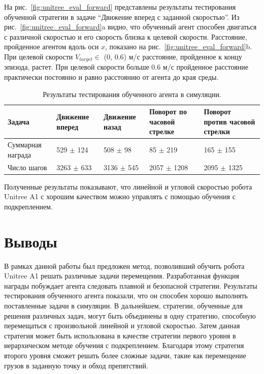 На рис.~\ref{fig:unitree_eval_forward} представлены результаты тестирования обученной стратегии в задаче ``Движение вперед с заданной скоростью''. Из рис.~\ref{fig:unitree_eval_forward}a видно, что обученный агент способен двигаться с различной скоростью и его скорость близка к целевой скорости. Расстояние, пройденное агентом вдоль оси $x$, показано на рис.~\ref{fig:unitree_eval_forward}b. При целевой скорости $V_{target} \in$ (0, 0.6) м/с расстояние, пройденное к концу эпизода, растет. При целевой скорости больше 0.6 м/с пройденное расстояние практически постоянно и равно расстоянию от агента до края среды.

\begin{table} [htbp]
    \centering
    \begin{threeparttable}
        \caption{Результаты тестирования обученного агента в симуляции.}\label{tab:unitree_eval}
        \begin{tabular}{| p{3cm} || p{3cm} | p{3cm} | p{3cm} |p{3cm} |}
            \hline
            \hline
            Задача & Движение вперед & Движение назад & Поворот по часовой стрелке & Поворот против часовой стрелки \\
            \hline
            Суммарная награда &	529 $\pm$ 124 &	508 $\pm$ 98 &	85 $\pm$ 219 &	165 $\pm$ 155 \\
            Число шагов & 3263 $\pm$ 633 &	3136 $\pm$ 545 &	2057 $\pm$ 1208 &	2095 $\pm$ 1325 \\
            \hline
            \hline
        \end{tabular}
    \end{threeparttable}
\end{table}

Полученные результаты показывают, что линейной и угловой скоростью робота Unitree A1 с хорошим качеством можно управлять с помощью обучения с подкреплением. 

\section{Выводы}

В рамках данной работы был предложен метод, позволивший обучить робота Unitree A1 решать различные задачи перемещения. Разработанная функция награды побуждает агента следовать плавной и безопасной стратегии. Результаты тестирования обученного агента показали, что он способен хорошо выполнять поставленные задачи в симуляции. В дальнейшем, стратегии, обученные для решения различных задач, могут быть объединены в одну стратегию, способную перемещаться с произвольной линейной и угловой скоростью. Затем данная стратегия может быть использована в качестве стратегии первого уровня в иерархическом методе обучения с подкреплением. Благодаря этому стратегия второго уровня сможет решать более сложные задачи, такие как перемещение грузов в заданную точку и обход препятствий. 



\clearpage
